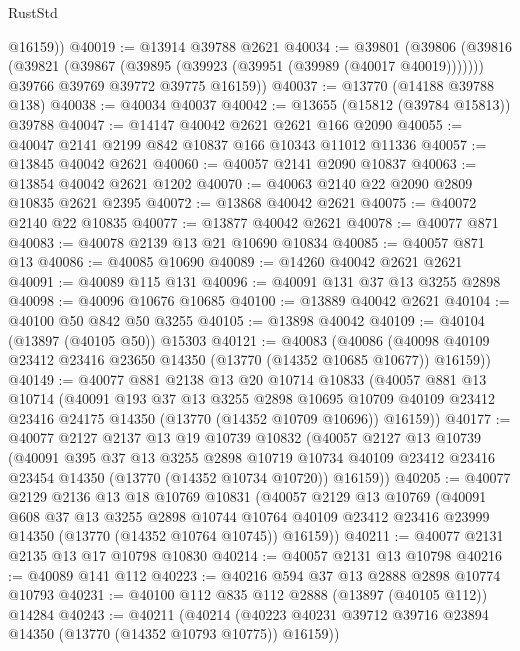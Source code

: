 \begin{lexlean}{RustStd}
\begin{coremodule}
        @16159))
@40019 := @13914 @39788 @2621
@40034 := @39801
    (@39806
      (@39816
        (@39821 (@39867 (@39895 (@39923 (@39951 (@39989 (@40017 @40019)))))))
        @39766
        @39769
        @39772
        @39775
        @16159))
@40037 := @13770 (@14188 @39788 @138)
@40038 := @40034 @40037
@40042 := @13655 (@15812 (@39784 @15813)) @39788
@40047 := @14147 @40042 @2621 @2621 @166 @2090
@40055 := @40047 @2141 @2199 @842 @10837 @166 @10343 @11012 @11336
@40057 := @13845 @40042 @2621
@40060 := @40057 @2141 @2090 @10837
@40063 := @13854 @40042 @2621 @1202
@40070 := @40063 @2140 @22 @2090 @2809 @10835 @2621 @2395
@40072 := @13868 @40042 @2621
@40075 := @40072 @2140 @22 @10835
@40077 := @13877 @40042 @2621
@40078 := @40077 @871
@40083 := @40078 @2139 @13 @21 @10690 @10834
@40085 := @40057 @871 @13
@40086 := @40085 @10690
@40089 := @14260 @40042 @2621 @2621
@40091 := @40089 @115 @131
@40096 := @40091 @131 @37 @13 @3255 @2898
@40098 := @40096 @10676 @10685
@40100 := @13889 @40042 @2621
@40104 := @40100 @50 @842 @50 @3255
@40105 := @13898 @40042
@40109 := @40104 (@13897 (@40105 @50)) @15303
@40121 := @40083
    (@40086 (@40098 @40109 @23412 @23416 @23650 @14350 (@13770 (@14352 @10685 @10677)) @16159))
@40149 := @40077
    @881
    @2138
    @13
    @20
    @10714
    @10833
    (@40057
      @881
      @13
      @10714
      (@40091
        @193
        @37
        @13
        @3255
        @2898
        @10695
        @10709
        @40109
        @23412
        @23416
        @24175
        @14350
        (@13770 (@14352 @10709 @10696))
        @16159))
@40177 := @40077
    @2127
    @2137
    @13
    @19
    @10739
    @10832
    (@40057
      @2127
      @13
      @10739
      (@40091
        @395
        @37
        @13
        @3255
        @2898
        @10719
        @10734
        @40109
        @23412
        @23416
        @23454
        @14350
        (@13770 (@14352 @10734 @10720))
        @16159))
@40205 := @40077
    @2129
    @2136
    @13
    @18
    @10769
    @10831
    (@40057
      @2129
      @13
      @10769
      (@40091
        @608
        @37
        @13
        @3255
        @2898
        @10744
        @10764
        @40109
        @23412
        @23416
        @23999
        @14350
        (@13770 (@14352 @10764 @10745))
        @16159))
@40211 := @40077 @2131 @2135 @13 @17 @10798 @10830
@40214 := @40057 @2131 @13 @10798
@40216 := @40089 @141 @112
@40223 := @40216 @594 @37 @13 @2888 @2898 @10774 @10793
@40231 := @40100 @112 @835 @112 @2888 (@13897 (@40105 @112)) @14284
@40243 := @40211
    (@40214 (@40223 @40231 @39712 @39716 @23894 @14350 (@13770 (@14352 @10793 @10775)) @16159))

\end{coremodule}
\end{lexlean}
